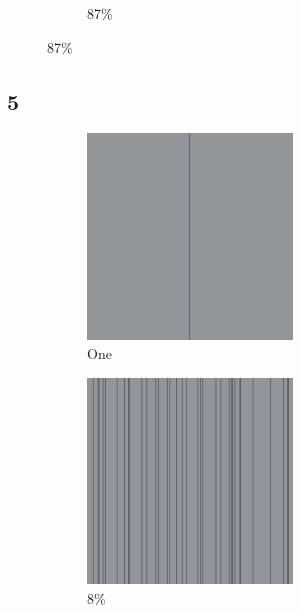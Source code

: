 \documentclass[12pt, fleqn]{report}                             %
\theoremstyle{break}                                            %
\begin{document}
\begin{figure}[ht!]
\begin{subfigure}[b]{0.4\linewidth}
          \caption{87\%}
        \end{subfigure}
      \end{figure}


      \clearpage
      \subsection{5}
      \begin{figure}[ht!]
        \centering
        \begin{subfigure}[b]{0.4\linewidth}
          \includegraphics[width=0.6\textwidth]{Images/5/a.png}
          \caption{One}
        \end{subfigure}
        \begin{subfigure}[b]{0.4\linewidth}
          \includegraphics[width=0.6\textwidth]{Images/5/b.png}
          \caption{8\%}
        \end{subfigure}
        \begin{subfigure}[b]{0.4\linewidth}

\end{subfigure}
\end{figure}
\end{document}
